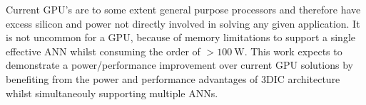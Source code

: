 Current GPU's are to some extent general purpose processors and therefore have excess silicon and power not directly involved in solving
any given application.
It is not uncommon for a GPU, because of memory limitations to support a single effective ANN whilst consuming the order of $> \SI{100}{\W}$.
This work expects to demonstrate a \iffalse solution with a 20X\fi power/performance improvement over current GPU solutions by benefiting from the power and performance 
advantages of 3DIC architecture \iffalse dissipating approximately \SI{40}{\W}\fi
whilst simultaneouly supporting multiple ANNs.


